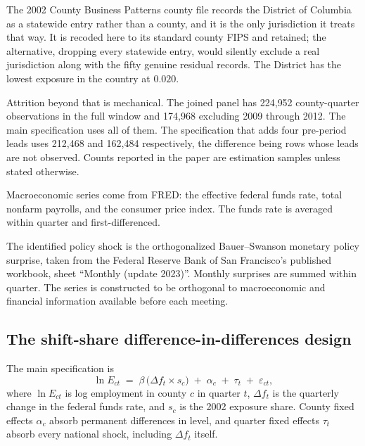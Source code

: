 The 2002 County Business Patterns county file records the District of Columbia
as a statewide entry rather than a county, and it is the only jurisdiction it
treats that way. It is recoded here to its standard county FIPS and retained;
the alternative, dropping every statewide entry, would silently exclude a real
jurisdiction along with the fifty genuine residual records. The District has the
lowest exposure in the country at $0.020$.

Attrition beyond that is mechanical. The joined panel has 224{,}952
county-quarter observations in the full window and 174{,}968 excluding 2009
through 2012. The main specification uses all of them. The specification that
adds four pre-period leads uses 212{,}468 and 162{,}484 respectively, the
difference being rows whose leads are not observed. Counts reported in the paper
are estimation samples unless stated otherwise.

Macroeconomic series come from FRED: the effective federal funds rate, total
nonfarm payrolls, and the consumer price index. The funds rate is averaged
within quarter and first-differenced.

The identified policy shock is the orthogonalized Bauer--Swanson monetary policy
surprise, taken from the Federal Reserve Bank of San Francisco's published
workbook, sheet ``Monthly (update 2023)''. Monthly surprises are summed within
quarter. The series is constructed to be orthogonal to macroeconomic and
financial information available before each meeting.

\subsection{The shift-share difference-in-differences design}

The main specification is
%
\begin{equation}
\ln E_{ct} \;=\; \beta \,\bigl(\Delta f_t \times s_c\bigr) \;+\; \alpha_c \;+\; \tau_t \;+\; \varepsilon_{ct},
\label{eq:did}
\end{equation}
%
where $\ln E_{ct}$ is log employment in county $c$ in quarter $t$, $\Delta f_t$
is the quarterly change in the federal funds rate, and $s_c$ is the 2002
exposure share. County fixed effects $\alpha_c$ absorb permanent differences in
level, and quarter fixed effects $\tau_t$ absorb every national shock, including
$\Delta f_t$ itself.

